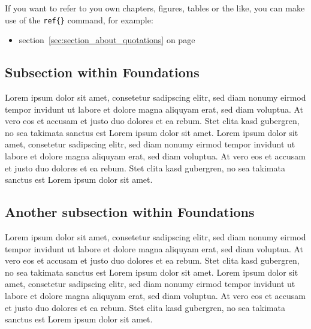 \documentclass[a4paper]{article}
\begin{document}
If you want to refer to you own chapters, figures, tables or the like, you can make use of the \texttt{ref\{\}} command, for example:
\begin{itemize}
	\item section~\ref{sec:section_about_quotations} on page \pageref{sec:section_about_quotations}
\end{itemize} 




\subsection{Subsection within Foundations} %
\label{sub:subsection_within_foundations}
Lorem ipsum dolor sit amet, consetetur sadipscing elitr, sed diam nonumy eirmod tempor invidunt ut labore et dolore magna aliquyam erat, sed diam voluptua. At vero eos et accusam et justo duo dolores et ea rebum. Stet clita kasd gubergren, no sea takimata sanctus est Lorem ipsum dolor sit amet. Lorem ipsum dolor sit amet, consetetur sadipscing elitr, sed diam nonumy eirmod tempor invidunt ut labore et dolore magna aliquyam erat, sed diam voluptua. At vero eos et accusam et justo duo dolores et ea rebum. Stet clita kasd gubergren, no sea takimata sanctus est Lorem ipsum dolor sit amet.

\subsection{Another subsection within Foundations} %
\label{sub:another_subsection_within_foundations}
Lorem ipsum dolor sit amet, consetetur sadipscing elitr, sed diam nonumy eirmod tempor invidunt ut labore et dolore magna aliquyam erat, sed diam voluptua. At vero eos et accusam et justo duo dolores et ea rebum. Stet clita kasd gubergren, no sea takimata sanctus est Lorem ipsum dolor sit amet. Lorem ipsum dolor sit amet, consetetur sadipscing elitr, sed diam nonumy eirmod tempor invidunt ut labore et dolore magna aliquyam erat, sed diam voluptua. At vero eos et accusam et justo duo dolores et ea rebum. Stet clita kasd gubergren, no sea takimata sanctus est Lorem ipsum dolor sit amet.


\end{document}
